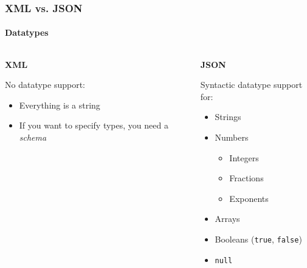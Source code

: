 \documentclass[
    alternativetitlepage=bild,
    cornerlogo=hgi_nds_logo2,
    sectionoverview,
]{rubpresentation}
\begin{document}
\begin{frame}[plain]
    \frametitle{XML vs. JSON}
    \framesubtitle{Datatypes}
    \begin{columns}[t]
        \begin{column}{0.5\textwidth}
            \begin{center}\textbf{\Large XML}\end{center}
            No datatype support:
            \begin{itemize}
                \item{} Everything is a string\\
                \item{} If you want to specify types, you need a %
                        \emph{schema}\\
            \end{itemize}
        \end{column}
        \begin{column}{0.5\textwidth}
            \begin{center}\textbf{\Large JSON}\end{center}
            Syntactic datatype support for:
            \begin{itemize}
                \item{} Strings\\
                \item{} Numbers
                    \begin{itemize}
                        \item{} Integers\\
                        \item{} Fractions\\
                        \item{} Exponents\\
                    \end{itemize}
                \item{} Arrays
                \item{} Booleans (\texttt{true}, \texttt{false})\\
                \item{} \texttt{null}\\
            \end{itemize}
        \end{column}
    \end{columns}
\end{frame}
\end{document}

